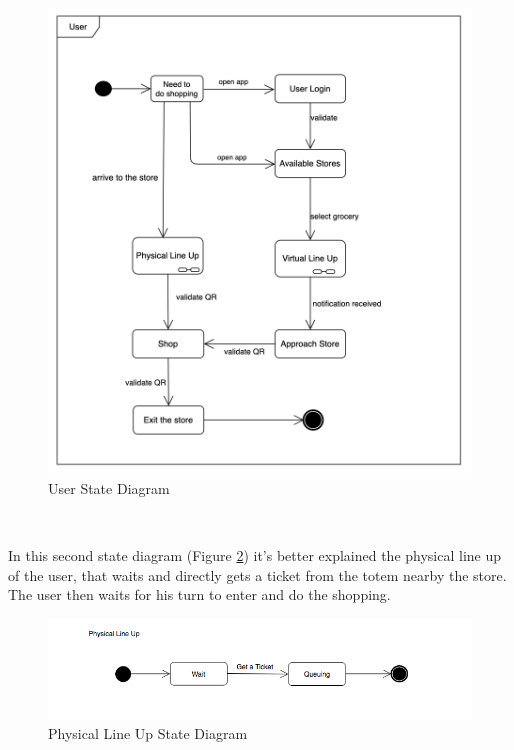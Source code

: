 \documentclass[]{article}
\begin{document}
		\begin{figure}[H]
			\centering
			\includegraphics[scale=0.8]{User_statediagram.png}
			\caption{User State Diagram}
			\label{fig:state_diagram1}
		\end{figure}
		
		
		

		\textbf{}\\ \newpage
		
		In this second state diagram (Figure \ref{fig:state_diagram2}) it’s better explained the physical line up of the user, that waits and directly gets a ticket from the totem nearby the store. The user then waits for his turn to enter and do the shopping.\\

		\begin{figure}[H]
			\centering
			\includegraphics[width=\linewidth]{PhysicalLineUp_statediagram.png}
			\caption{Physical Line Up State Diagram}
			\label{fig:state_diagram2}
		\end{figure}
		
\end{document}
